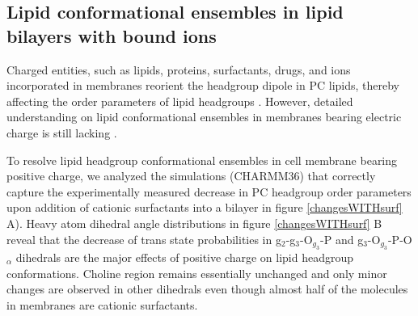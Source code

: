 \documentclass[aps,prl,superscriptaddress,twocolumn]{revtex4}
\begin{document}
\subsection{Lipid conformational ensembles in lipid bilayers with bound ions}

Charged entities, such as lipids, proteins, surfactants, drugs, and ions incorporated in membranes reorient the headgroup dipole in PC lipids, thereby affecting the order parameters of lipid headgroups \cite{seelig87}. However, detailed understanding on lipid conformational ensembles in membranes bearing electric charge is still lacking \cite{Semchyschyn04}.

To resolve lipid headgroup conformational ensembles in cell membrane bearing positive charge, we analyzed the simulations (CHARMM36) that correctly capture the experimentally measured decrease in PC headgroup order parameters upon addition of cationic surfactants into a bilayer in figure \ref{changesWITHsurf} A). Heavy atom dihedral angle distributions in figure \ref{changesWITHsurf} B reveal that the decrease of trans state probabilities in g$_2$-g$_3$-O$_{g_3}$-P and g$_3$-O$_{g_3}$-P-O$_\alpha$
dihedrals are the major effects of positive charge on lipid headgroup conformations. Choline region remains essentially unchanged and only minor changes are observed in other dihedrals even though almost half of the molecules in membranes are cationic surfactants. 
\end{document}
